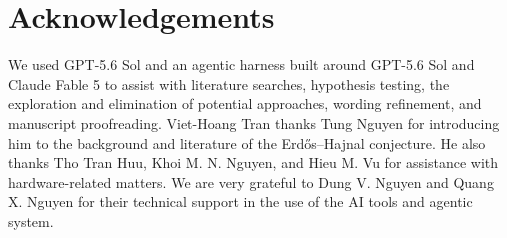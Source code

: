 \documentclass[11pt]{article}
\numberwithin{equation}{section}
\theoremstyle{plain}
\theoremstyle{definition}
\begin{document}
\section*{Acknowledgements}

We used GPT-5.6 Sol and an agentic harness built around GPT-5.6 Sol and Claude Fable 5 to assist with literature searches, hypothesis testing, the exploration and elimination of potential approaches, wording refinement, and manuscript proofreading. Viet-Hoang Tran thanks Tung Nguyen for introducing him to the background and literature of the Erdős–Hajnal conjecture. He also thanks Tho Tran Huu, Khoi M. N. Nguyen, and Hieu M. Vu for assistance with hardware-related matters. We are very grateful to Dung V. Nguyen and Quang X. Nguyen for their technical support in the use of the AI tools and agentic system.


{}
\begingroup
\small
\raggedright

\endgroup
\end{document}

